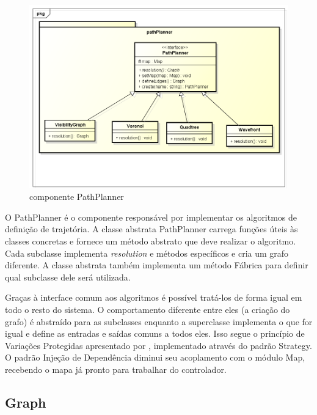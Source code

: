 \begin{figure}[h]
	\centering
	\label{fig28}
		\includegraphics[keepaspectratio=true,scale=0.5]{figuras/pkgpathplanner.png}
	\caption{componente PathPlanner}
\end{figure}

O PathPlanner é o componente responsável por implementar os algoritmos de definição de trajetória. A classe abstrata PathPlanner carrega funções úteis às classes concretas e fornece um método abstrato que deve realizar o algoritmo. Cada subclasse implementa \textit{resolution} e métodos específicos e cria um grafo diferente. A classe abstrata também implementa um método Fábrica para definir qual subclasse dele será utilizada.

Graças à interface comum aos algoritmos é possível tratá-los de forma igual em todo o resto do sistema. O comportamento diferente entre eles (a criação do grafo) é abstraído para as subclasses enquanto a superclasse implementa o que for igual e define as entradas e saídas comuns a todos eles. Isso segue o princípio de Variações Protegidas apresentado por \cite{Larman2005}, implementado através do padrão Strategy. O padrão Injeção de Dependência diminui seu acoplamento com o módulo Map, recebendo o mapa já pronto para trabalhar do controlador.

\subsection{Graph}

